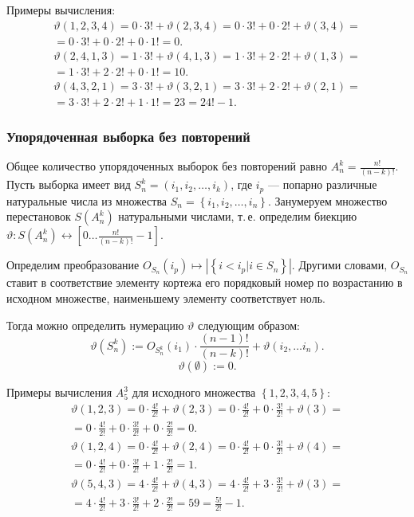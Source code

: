 \documentclass[12pt,a4paper,oneside]{article}
\begin{document}
Примеры вычисления:
\begin{eqnarray*}
\vartheta(1,2,3,4) = 0\cdot3!+\vartheta(2,3,4) = 0\cdot3!+0\cdot2!+\vartheta(3,4)=\\
= 0\cdot3!+0\cdot2!+0\cdot1! = 0.
\end{eqnarray*}
\begin{eqnarray*}
\vartheta(2,4,1,3) = 1\cdot3!+\vartheta(4,1,3) = 1\cdot3!+2\cdot2!+\vartheta(1,3)=\\
= 1\cdot3!+2\cdot2!+0\cdot1! = 10.
\end{eqnarray*}
\begin{eqnarray*}
\vartheta(4,3,2,1) = 3\cdot3!+\vartheta(3,2,1) = 3\cdot3!+2\cdot2!+\vartheta(2,1)=\\
= 3\cdot3!+2\cdot2!+1\cdot1! = 23 = 24!-1.
\end{eqnarray*}

\subsubsection{Упорядоченная выборка без повторений}
Общее количество упорядоченных выборок без повторений равно $A^k_n=\frac{n!}{(n-k)!}$.
Пусть выборка имеет вид $S^k_n=\left(i_1,i_2,\ldots,i_k\right)$, где $i_p$ --- попарно различные натуральные числа из множества $S_n=\left\{i_1,i_2,\ldots,i_n\right\}$. Занумеруем множество перестановок $S(A^k_n)$ натуральными числами, т.\,е. определим биекцию $\vartheta: S(A^k_n)\leftrightarrow\left[0\ldots \frac{n!}{(n-k)!}-1\right]$.

Определим преобразование $O_{S_n}(i_p)\mapsto \left| \left\{i < i_p | i \in S_n \right\} \right|$. Другими словами, $O_{S_n}$ ставит в соответствие элементу кортежа его порядковый номер по возрастанию в исходном множестве, наименьшему элементу соответствует ноль.

Тогда можно определить нумерацию $\vartheta$ следующим образом:
$$
\vartheta(S^k_n) := O_{S^k_n}(i_1)\cdot\frac{(n-1)!}{(n-k)!} + \vartheta(i_2,\ldots i_{n}).
$$
$$
\vartheta(\emptyset) := 0.
$$

Примеры вычисления $A^3_5$ для исходного множества $\left\{1,2,3,4,5\right\}$:
\begin{eqnarray*}
\vartheta(1,2,3) = 0\cdot\frac{4!}{2!}+\vartheta(2,3) = 0\cdot\frac{4!}{2!}+0\cdot\frac{3!}{2!}+\vartheta(3) =\\
= 0\cdot\frac{4!}{2!}+0\cdot\frac{3!}{2!}+0\cdot\frac{2!}{2!} = 0.
\end{eqnarray*}
\begin{eqnarray*}
\vartheta(1,2,4) = 0\cdot\frac{4!}{2!}+\vartheta(2,4) = 0\cdot\frac{4!}{2!}+0\cdot\frac{3!}{2!}+\vartheta(4) =\\
= 0\cdot\frac{4!}{2!}+0\cdot\frac{3!}{2!}+1\cdot\frac{2!}{2!} = 1.
\end{eqnarray*}
\begin{eqnarray*}
\vartheta(5,4,3) = 4\cdot\frac{4!}{2!}+\vartheta(4,3) = 4\cdot\frac{4!}{2!}+3\cdot\frac{3!}{2!}+\vartheta(3) =\\
= 4\cdot\frac{4!}{2!}+3\cdot\frac{3!}{2!}+2\cdot\frac{2!}{2!} = 59 = \frac{5!}{2!}-1.
\end{eqnarray*}
\end{document}
